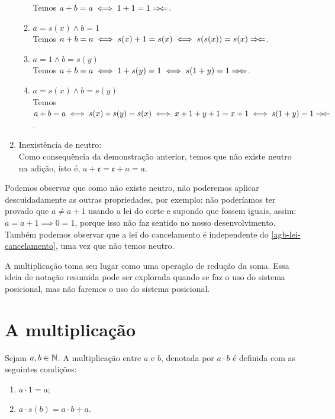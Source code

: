 \documentclass[../main.tex]{subfiles}
\begin{document}
\begin{dem}
\begin{enumerate}[label=(\roman*)]
\begin{enumerate}[label=(\arabic*)]
                Temos $a+b=a \iff 1+1=1 \Rightarrow\!\Leftarrow$. 
            \item $a=s(x) \land b=1$ \\
                Temos $a+b=a \iff s(x) + 1 = s(x) \iff s(s(x)) = s(x) \Rightarrow\!\Leftarrow$. 
            \item $a=1 \land b=s(y)$ \\
                Temos $a+b=a \iff 1+ s(y) = 1 \iff s(1+y) = 1 \Rightarrow\!\Leftarrow$. 
            \item $a=s(x) \land b=s(y)$ \\
                Temos $a+b=a \iff s(x) + s(y) = s(x) \iff x + 1 + y + 1 = x + 1 \iff s(1 + y) = 1 \Rightarrow\!\Leftarrow$.
            \end{enumerate}
    
        \item Inexistência de neutro: \\
            Como consequência da demonstração anterior, temos que não existe neutro na adição, isto é, $a + \mathfrak{e} = \mathfrak{e} + a = a$.
    \end{enumerate}
\end{dem}
 
Podemos observar que como não existe neutro, não poderemos aplicar descuidadamente as outras propriedades, por exemplo: não poderíamos ter provado que $a \neq a + 1 $ usando a lei do corte e supondo que fossem iguais, assim: $a = a+ 1 \implies 0 = 1$, porque isso não faz sentido no nosso desenvolvimento. Também podemos observar que a lei do cancelamento é independente do \cref{agb-lei-cancelamento}, uma vez que não temos neutro.

A multiplicação toma seu lugar como uma operação de redução da soma. Essa ideia de notação resumida pode ser explorada quando se faz o uso do sistema posicional, mas não faremos o uso do sistema posicional. 


\section{A multiplicação}
\begin{defi}\label{nat-def-multiplicacao}
    Sejam $a, b \in \mathbb{N}$. A multiplicação entre $a$ e $b$, denotada por $a \cdot b$ é definida com as seguintes condições: 
	\begin{enumerate}[label=(\roman*)]
		\item $a \cdot 1 = a$;
		\item $a \cdot s(b) = a \cdot b + a$.
	\end{enumerate}
\end{defi}
\end{document}
